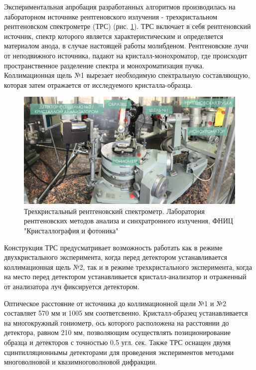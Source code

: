 Экспериментальная апробация разработанных алгоритмов производилась на лабораторном источнике
рентгеновского излучения - трехкристальном рентгеновском спектрометре (ТРС) (рис. \ref{ris:trs}).
ТРС включает в себя рентгеновский источник, спектр которого является характеристическим и
определяется материалом анода, в случае настоящей работы молибденом. Рентгеновские
лучи от неподвижного источника, падают на кристалл-монохроматор, где происходит
пространственное разделение спектра и монохроматизация пучка. Коллимационная щель №1
вырезает необходимую спектральную составляющую, которая затем отражается от исследуемого кристалла-образца.

\begin{figure}[H]
  \centering
  \includegraphics[width=1\textwidth]{images/trs.png}
  \caption{ Трехкристальный рентгеновский спектрометр. Лаборатория рентгеновских
  методов анализа и синхратронного излучения, ФНИЦ "Кристаллография и фотоника"}
  \label{ris:trs}
\end{figure}

Конструкция ТРС предусматривает возможность работать как в режиме двухкристального эксперимента,
когда перед детектором устанавливается коллимационная щель №2,
так и в режиме трехкристального эксперимента, когда на место
 перед детектором устанавливается кристалл-анализатор и отраженный от анализатора луч
фиксируется детектором.

Оптическое расстояние от источника до коллимационной щели №1 и №2 составляет 570 мм
и 1005 мм соответсвенно. Кристалл-образец устанавливается на многокружный гониометр,
ось которого расположена на расстоянии до детектора, равном 210 мм,
позволяющим осуществлять позиционирование образца и детекторов
 с точностью 0.5 угл. сек. Также ТРС оснащен двумя сцинтилляционнымы детекторами для
проведения экспериментов методами многоволновой и квазимноговолновой дифракции.
